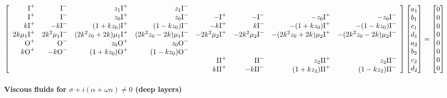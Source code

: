 \documentclass[prfluids]{revtex4-2}
\newcommand{\zeroplu}{\text{O}^+}
\newcommand{\zeromin}{\text{O}^-}
\newcommand{\oneplus}{\text{I}^+}
\newcommand{\onemins}{\text{I}^-}
\newcommand{\twoplus}{\text{II}^+}
\newcommand{\twomins}{\text{II}^-}
\begin{document}
\begin{footnotesize}\begin{eqnarray*}
  \left[\begin{array}{r r r r r r r r }
         \oneplus &   \onemins &      z_1\oneplus &      z_1\onemins \\
         \oneplus &   \onemins &      z_0\oneplus &      z_0\onemins &
         -\oneplus &  -\onemins &     -z_0\oneplus &     -z_0\onemins \\
         k\oneplus & -k\onemins & (1+kz_0)\oneplus & (1-kz_0)\onemins &
        -k\oneplus &  k\onemins &-(1+kz_0)\oneplus &-(1-kz_0)\onemins \\
      2k\mu_1        \oneplus & 2k^2\mu_1         \onemins &
     (2k^2z_0 + 2k)\mu_1 \oneplus & (2k^2z_0 - 2k) \mu_1\onemins &
     -2k^2\mu_2         \oneplus & -2k^2\mu_2         \onemins &
     -(2k^2z_0 + 2k)\mu_2 \oneplus & -(2k^2z_0 - 2k) \mu_2\onemins \\
         \zeroplu &   \zeromin &      z_0\zeroplu &      z_0\zeromin \\
        k\zeroplu & -k\zeromin & (1+kz_0)\zeroplu & (1-kz_0)\zeromin \\
    &&&& \twoplus &   \twomins &      z_2\twoplus &      z_2\twomins \\
    &&&&k\twoplus & -k\twomins & (1+kz_2)\twoplus & (1-kz_2)\twomins 
  \end{array}\right]
  \left[\begin{matrix}
    a_1 \\ b_1 \\ c_1 \\ d_1 \\
    a_2 \\ b_2 \\ c_2 \\ d_2
  \end{matrix}\right]
  =
  \left[\begin{matrix}
    0 \\ 0 \\ 0 \\ 0
    \\ 0 \\ 0 \\ 0 \\ 0
  \end{matrix}\right]
\end{eqnarray*}\end{footnotesize}


\paragraph{Viscous fluids for $\sigma + i(\alpha + \omega n)\neq0$ (deep layers)}
\end{document}
